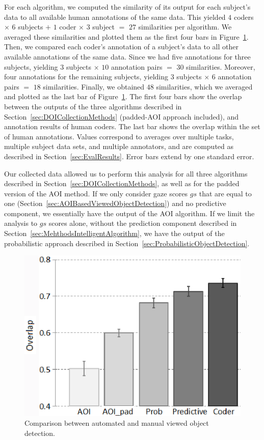 For each algorithm, we computed the similarity of its output for each subject's data to all available human annotations of the same data.  This yielded $4$ coders $\times$ $6$ subjects $+$  $1$ coder $\times$ $3$ subject $=$ $27$ similarities per algorithm. We averaged these similarities and plotted them as the first four bars in Figure~\ref{fig:quantitative}. Then, we compared each coder's annotation of a subject's data to all other available annotations of the same data. Since we had five annotations for three subjects, yielding $3$ subjects $\times$ $10$ annotation pairs $=$ $30$ similarities. Moreover, four annotations for the remaining subjects, yielding $3$ subjects $\times$ $6$ annotation pairs $=$ $18$ similarities. Finally,  we obtained $48$ similarities, which we averaged and plotted as the last bar of Figure~\ref{fig:quantitative}. The first four bars show the overlap between the outputs of
the three algorithms described in Section~\ref{sec:DOICollectionMethods} (padded-AOI approach included), and annotation results of human coders. The last bar shows the overlap within the set of human annotations. Values correspond to averages over multiple tasks, multiple subject data sets, and multiple annotators, and are computed as described in Section~\ref{sec:EvalResults}. Error bars extend by one standard error.

Our collected data allowed us to perform this analysis for all three algorithms described in Section~\ref{sec:DOICollectionMethods}, as well as for the padded version of the AOI method. If we only consider gaze scores $gs$ that are equal to one (Section~\ref{sec:AOIBasedViewedObjectDetection}) and no predictive component, we essentially have the output of the AOI algorithm. If we limit the analysis to $gs$ scores alone, without the prediction component described in Section~\ref{sec:MehthodsIntelligentAlgorithm}, we have the output of the probabilistic approach described in Section~\ref{sec:ProbabilisticObjectDetection}.

\begin{figure}[htb]
  \centering
  \includegraphics[width=0.6\linewidth]{images/algosComparison.eps}
  \caption{Comparison between automated and manual viewed object detection. }
	\label{fig:quantitative}
\end{figure}


